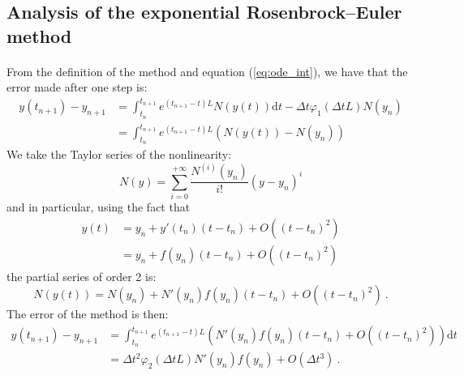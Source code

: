     \subsection{Analysis of the exponential Rosenbrock--Euler method}

      \paragraph{}
      From the definition of the method and equation (\ref{eq:ode_int}), we have that the error made after one step is:
      \begin{equation}
        \begin{aligned}
          y\left(t_{n+1}\right) - y_{n+1} &= \int_{t_n}^{t_{n+1}} e^{\left(t_{n+1} - t\right) L} N\left(y\left(t\right)\right) \mathrm{d}t  - \Delta t \varphi_1\left(\Delta t L\right) N\left(y_n\right) \\
          &= \int_{t_n}^{t_{n+1}} e^{\left(t_{n+1} - t\right) L} \left( N\left(y\left(t\right)\right) - N\left(y_n\right) \right)
        \end{aligned}
      \end{equation}
      We take the Taylor series of the nonlinearity:
      \begin{equation}
        N\left(y\right) = \sum_{i = 0}^{+\infty} \frac{N^{\left(i\right)}\left(y_n\right)}{i!}\left(y - y_n\right)^i
      \end{equation}
      and in particular, using the fact that
      \begin{equation}
        \begin{aligned}
          y\left(t\right) &= y_n + y'\left(t_n\right)\left(t - t_n\right) + O\left(\left(t - t_n\right)^2\right) \\
          & = y_n + f\left(y_n\right)\left(t - t_n\right) + O\left(\left(t - t_n\right)^2\right)
        \end{aligned}
      \end{equation}
      the partial series of order 2 is:
      \begin{equation}
        N\left(y\left(t\right)\right) = N\left(y_n\right) + N'\left(y_n\right)f\left(y_n\right)\left(t - t_n\right) + O\left(\left(t - t_n\right)^2\right) \ .
      \end{equation}
      The error of the method is then:
      \begin{equation}
        \begin{aligned}
          y\left(t_{n+1}\right) - y_{n+1} &= \int_{t_n}^{t_{n+1}} e^{\left(t_{n+1} - t\right) L} \left( N'\left(y_n\right)f\left(y_n\right)\left(t - t_n\right) + O\left(\left(t - t_n\right)^2\right) \right) \mathrm{d}t \\
          &= \Delta t^2\varphi_2\left(\Delta t L\right) N'\left(y_n\right)f\left(y_n\right) + O\left(\Delta t^3\right) \ .
        \end{aligned}
      \end{equation}
